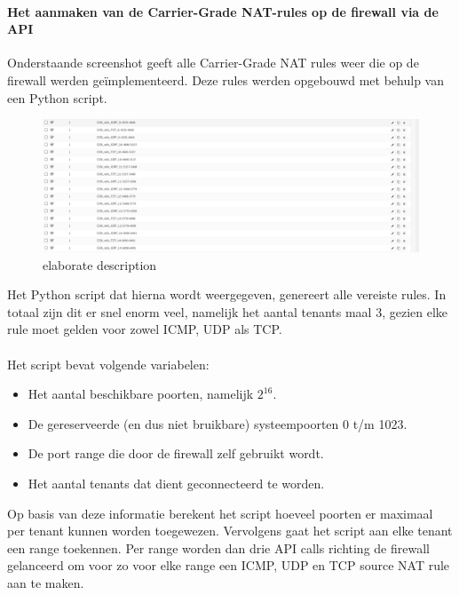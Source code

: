 \paragraph{Het aanmaken van de Carrier-Grade NAT-rules op de firewall via de API}
Onderstaande screenshot geeft alle Carrier-Grade NAT rules weer die op de firewall werden geïmplementeerd. Deze rules werden opgebouwd met behulp van een Python script.

\begin{figure}[!htbp]
    \includegraphics[width=\textwidth]{graphics/opnsense_cgnat_rules.PNG}
    \caption[OPNsense met CGN regels]{elaborate description}
    \label{fig:FirewallCGNRules}
\end{figure}

Het Python script dat hierna wordt weergegeven, genereert alle vereiste rules. In totaal zijn dit er snel enorm veel, namelijk het aantal tenants maal 3, gezien elke rule moet gelden voor zowel ICMP, UDP als TCP.

\paragraph{}
Het script bevat volgende variabelen:

\begin{itemize}
    \item Het aantal beschikbare poorten, namelijk $2^{16}$.
    \item De gereserveerde (en dus niet bruikbare) systeempoorten 0 t/m 1023.
    \item De port range die door de firewall zelf gebruikt wordt.
    \item Het aantal tenants dat dient geconnecteerd te worden.
\end{itemize}

Op basis van deze informatie berekent het script hoeveel poorten er maximaal per tenant kunnen worden toegewezen.
Vervolgens gaat het script aan elke tenant een range toekennen.
Per range worden dan drie API calls richting de firewall gelanceerd om voor zo voor elke range een ICMP, UDP en TCP source NAT rule aan te maken.

